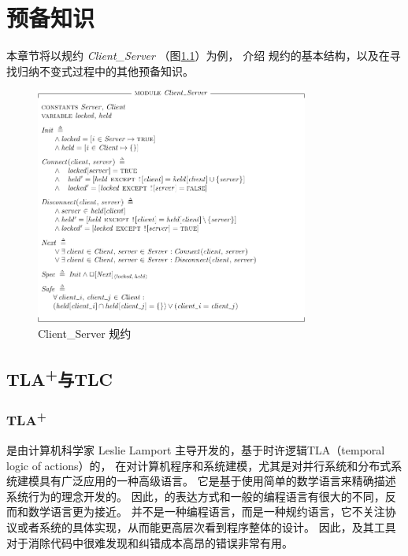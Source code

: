 \chapter{预备知识}\label{chap:pre-knowleage}

本章节将以规约 \textit{Client\_Server} （图\ref{fig:client_server}）为例，
介绍 \TLA 规约的基本结构，以及在寻找归纳不变式过程中的其他预备知识。
\begin{figure}[h]
    \centering
    \includegraphics[width=0.8\textwidth]{figures/Client_Server.pdf}
    \caption{Client\_Server 规约}
    \label{fig:client_server}
\end{figure}

\section{\texorpdfstring{TLA\textsuperscript{+}与TLC}{TLA+与TLC}}
\subsection{\texorpdfstring{TLA\textsuperscript{+}}{TLA+}}
\href{https://lamport.azurewebsites.net/tla/tla.html}{\TLA} \cite{TLA+}是由计算机科学家 Leslie Lamport 主导开发的，基于时许逻辑TLA（temporal logic of actions）\cite{temporal}的，
在对计算机程序和系统建模，尤其是对并行系统和分布式系统建模具有广泛应用\cite{PaxosStore}的一种高级语言。
它是基于使用简单的数学语言来精确描述系统行为的理念开发的。
因此，\TLA 的表达方式和一般的编程语言有很大的不同，反而和数学语言更为接近。
\TLA 并不是一种编程语言，而是一种规约语言，它不关注协议或者系统的具体实现，从而能更高层次看到程序整体的设计。
因此，\TLA 及其工具对于消除代码中很难发现和纠错成本高昂的错误非常有用。

